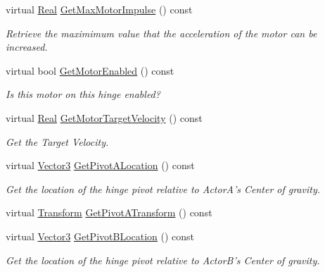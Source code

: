 \begin{DoxyCompactItemize}
virtual \hyperlink{namespaceMezzanine_a726731b1a7df72bf3583e4a97282c6f6}{Real} \hyperlink{classMezzanine_1_1HingeConstraint_a02ea6dc2a0e80649737c4c478fec274d}{GetMaxMotorImpulse} () const 
\begin{DoxyCompactList}\small\item\em Retrieve the maximimum value that the acceleration of the motor can be increased. \item\end{DoxyCompactList}\item 
virtual bool \hyperlink{classMezzanine_1_1HingeConstraint_adcc717f158be2173d179004a6b8d2b11}{GetMotorEnabled} () const 
\begin{DoxyCompactList}\small\item\em Is this motor on this hinge enabled? \item\end{DoxyCompactList}\item 
virtual \hyperlink{namespaceMezzanine_a726731b1a7df72bf3583e4a97282c6f6}{Real} \hyperlink{classMezzanine_1_1HingeConstraint_ab357a37ce5a447b007cbaef74c4b47d5}{GetMotorTargetVelocity} () const 
\begin{DoxyCompactList}\small\item\em Get the Target Velocity. \item\end{DoxyCompactList}\item 
virtual \hyperlink{classMezzanine_1_1Vector3}{Vector3} \hyperlink{classMezzanine_1_1HingeConstraint_a74f1b8d8de18ab991d2f42c7141eedc7}{GetPivotALocation} () const 
\begin{DoxyCompactList}\small\item\em Get the location of the hinge pivot relative to ActorA's Center of gravity. \item\end{DoxyCompactList}\item 
virtual \hyperlink{classMezzanine_1_1Transform}{Transform} \hyperlink{classMezzanine_1_1HingeConstraint_a208687c856410bf70f068ddf8c8f9161}{GetPivotATransform} () const 
\item 
virtual \hyperlink{classMezzanine_1_1Vector3}{Vector3} \hyperlink{classMezzanine_1_1HingeConstraint_a87b14b3cbf5241aeba723226661764e6}{GetPivotBLocation} () const 
\begin{DoxyCompactList}\small\item\em Get the location of the hinge pivot relative to ActorB's Center of gravity. \item\end{DoxyCompactList}\item 

\end{DoxyCompactItemize}
